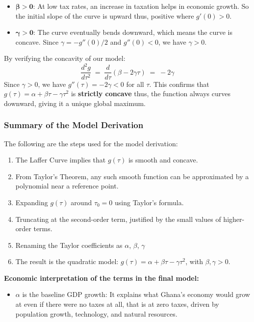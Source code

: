 \documentclass[12pt,a4paper]{report}
\theoremstyle{definition}
\theoremstyle{plain}
\theoremstyle{remark}
\begin{document}
{\begin{itemize}[leftmargin=1.5em]
			\item $\boldsymbol{\beta > 0}$: At low tax rates, an increase in taxation
			helps in economic growth. So the initial slope of the curve is upward thus, positive where $g'(0) > 0$.
			
			\item $\boldsymbol{\gamma > 0}$: The curve eventually bends downward, which means
			the curve is concave. Since $\gamma = -g''(0)/2$ and $g''(0) < 0$,
			we have $\gamma > 0$.
			
		\end{itemize}
		
		
		\noindent
		By verifying the concavity of our model:
		\[
		\frac{d^2 g}{d\tau^2} \;=\; \frac{d}{d\tau}\!\left(\beta - 2\gamma\tau\right)
		\;=\; -2\gamma
		\]
		Since $\gamma > 0$, we have $g''(\tau) = -2\gamma < 0$ for all $\tau$.
		This confirms that $g(\tau) = \alpha + \beta\tau - \gamma\tau^2$ is
		\textbf{strictly concave} thus, the function always curves downward,
		giving it a unique global maximum.
		
		\subsubsection*{Summary of the Model Derivation}
		
		The following are the steps used for the model derivation:
		
		\begin{enumerate}[label=\textbf{Step \arabic*:}]
			\item The Laffer Curve implies that $g(\tau)$ is smooth and concave.
			\item  From Taylor's Theorem, any such smooth function can be
			approximated by a polynomial near a reference point.
			\item Expanding $g(\tau)$ around $\tau_0 = 0$ using Taylor's formula.
			\item Truncating at the second-order term, justified by the small
			values of higher-order terms. 
			\item Renaming the Taylor coefficients as $\alpha$, $\beta$, $\gamma$
			
			\item The result is the quadratic model:
			$g(\tau) = \alpha + \beta\tau - \gamma\tau^2$, with $\beta, \gamma > 0$.
		\end{enumerate}
		
		\medskip
		\noindent
		\textbf{Economic interpretation of the terms in the final model:}
		\begin{itemize}
			\item $\alpha$ \; is the baseline GDP growth: It explains what Ghana's economy
			would grow at even if there were no taxes at all, that is at zero taxes, driven by population
			growth, technology, and natural resources.
			

\end{itemize}}
\end{document}
